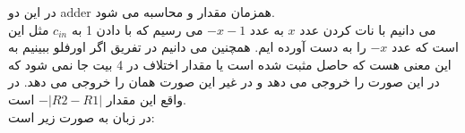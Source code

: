 در این دو 
adder
همزمان مقدار
و
محاسبه می شود.\\
می دانیم با نات کردن عدد 
$x$
به عدد
$-x-1$
می رسیم که با دادن 1 به 
$c_{in}$
مثل این است که عدد
$-x$
را به دست آورده ایم. همچنین
می دانیم در تفریق اگر اورفلو ببینیم به این معنی هست که حاصل مثبت شده است یا مقدار اختلاف در 4 بیت جا نمی شود که در این صورت
را خروجی می دهد و در غیر این صورت همان
را خروجی می دهد.
در واقع این مقدار 
$-|R2-R1|$
است.\\
در زبان
به صورت زیر است:\\
